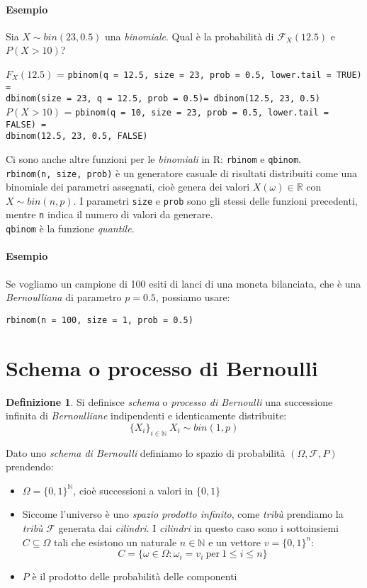\documentclass[12pt, a4paper]{report}
\theoremstyle{definition}
\newtheorem{definition}{Definizione}[section]
\DeclareRobustCommand{\F}{\mathcal{F}}%
\DeclareRobustCommand{\R}{\mathbb{R}}%
\DeclareRobustCommand{\N}{\mathbb{N}}%
\DeclareRobustCommand{\probspace}{(\Omega,\F,P)}
\begin{document}
\paragraph*{Esempio}
Sia $X\sim bin(23, 0.5)$ una \emph{binomiale}. Qual è la probabilità di
$\F_X(12.5)$ e \(P(X>10)\)?
\begin{center}
	$F_X(12.5)$ = \texttt{pbinom(q = 12.5, size = 23, prob = 0.5, lower.tail = TRUE) =}\\
	\texttt{dbinom(size = 23, q = 12.5, prob = 0.5)= dbinom(12.5, 23, 0.5)}\\
	$P(X>10)$ = \texttt{pbinom(q = 10, size = 23, prob = 0.5, lower.tail = FALSE) =}\\
	\texttt{dbinom(12.5, 23, 0.5, FALSE)}
\end{center}

Ci sono anche altre funzioni per le \emph{binomiali} in R: \texttt{rbinom} e
\texttt{qbinom}.\\
\texttt{rbinom(n, size, prob)} è un generatore casuale di risultati distribuiti
come una binomiale dei parametri assegnati, cioè genera dei valori \(X(\omega)
\in\R\) con \(X\sim bin(n,p)\). I parametri \texttt{size} e \texttt{prob} sono
gli stessi delle funzioni precedenti, mentre \texttt{n} indica il numero di valori
da generare.\\
\texttt{qbinom} è la funzione \emph{quantile}.

\paragraph*{Esempio}
Se vogliamo un campione di 100 esiti di lanci di una moneta bilanciata, che è una
\emph{Bernoulliana} di parametro \(p=0.5\), possiamo usare:
\begin{center}
	\texttt{rbinom(n = 100, size = 1, prob = 0.5)}
\end{center}

\section{Schema o processo di Bernoulli}
\begin{definition}
	Si definisce \emph{schema} o \emph{processo di Bernoulli} una successione
	infinita di \emph{Bernoulliane} indipendenti e identicamente distribuite:
	\[\{X_i\}_{i\in\N}\ X_i\sim bin(1,p)\]
\end{definition}

Dato uno \emph{schema di Bernoulli} definiamo lo spazio di probabilità $\probspace$
prendendo:
\begin{itemize}
	\item $\Omega=\{0,1\}^\N$, cioè successioni a valori in $\{0,1\}$
	\item Siccome l'universo è uno \emph{spazio prodotto infinito}, come
	\emph{tribù} prendiamo la \emph{tribù} $\F$ generata dai \emph{cilindri}.
	I \emph{cilindri} in questo caso sono i sottoinsiemi \(C\subseteq\Omega\)
	tali che esistono un naturale \(n\in\N\) e un vettore \(v=\{0,1\}^n\):
	\[C=\{\omega\in\Omega : \omega_i = v_i\ \text{per}\ 1\leq i\leq n\}\]
	\item $P$ è il prodotto delle probabilità delle componenti
\end{itemize}
\end{document}

